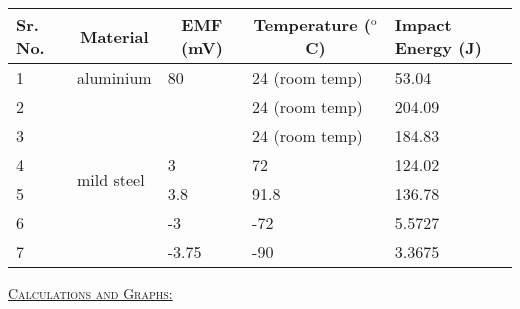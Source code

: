 \documentclass[a4paper, 11pt]{article}
\begin{document}
\begin{center}
\def\arraystretch{1.5}
\begin{tabular}{|l|l|l|l|l|}
\hline
\textbf{Sr. No.} & \multicolumn{1}{c|}{\textbf{Material}} & \multicolumn{1}{c|}{\textbf{EMF (mV)}} & \multicolumn{1}{c|}{\textbf{Temperature ($^{\text{o}}$C)}} & \textbf{Impact Energy (J)} \\ \hline
1                & aluminium                              & 80                                     & 24 (room temp)                                & 53.04                      \\ \hline
2                & \multirow{6}{*}{mild steel}            &                                        & 24 (room temp)                                & 204.09                     \\ \cline{1-1} \cline{3-5} 
3                &                                        &                                        & 24 (room temp)                                & 184.83                     \\ \cline{1-1} \cline{3-5} 
4                &                                        & 3                                      & 72                                            & 124.02                     \\ \cline{1-1} \cline{3-5} 
5                &                                        & 3.8                                    & 91.8                                          & 136.78                     \\ \cline{1-1} \cline{3-5} 
6                &                                        & -3                                     & -72                                           & 5.5727                     \\ \cline{1-1} \cline{3-5} 
7                &                                        & -3.75                                  & -90                                           & 3.3675                     \\ \hline
\end{tabular}
\end{center}
\underline{\textsc{Calculations and Graphs:}}
\vspace{2mm}
\end{document}
